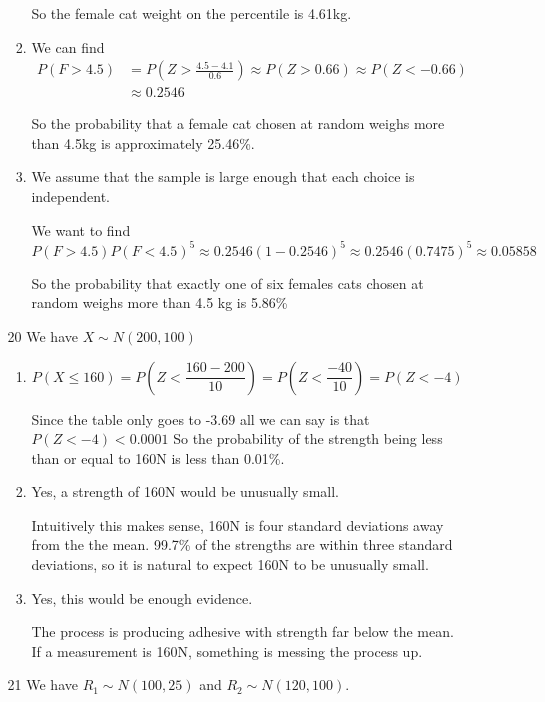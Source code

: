 \documentclass[12pt,letterpaper]{article}
\begin{document}
\begin{enumerate}
\begin{enumerate}
\begin{enumerate}[label=(\arabic*)]
              So the female cat weight on the  percentile is 4.61kg.
            \item
              We can find
              \begin{align*}
                P(F > 4.5) &= P\left(Z > \frac{4.5 - 4.1}{0.6}\right) \approx P(Z > 0.66) \approx P(Z < -0.66) \\
                &\approx 0.2546
              \end{align*}

              So the probability that a female cat chosen at random weighs more than 4.5kg is approximately 25.46\%.
            \item
              We assume that the sample is large enough that each choice is independent.

              We want to find
              \[
                P(F > 4.5) P(F < 4.5)^5 \approx 0.2546 (1 - 0.2546)^5 \approx 0.2546 (0.7475)^5 \approx 0.05858
              \]

              So the probability that exactly one of six females cats chosen at random weighs more than 4.5 kg is 5.86\%
          \end{enumerate}
        \item [20]
          We have $X \sim N(200, 100)$
          \begin{enumerate}[label=(\arabic*)]
            \item
              \[
                P(X \le 160) = P\left(Z < \frac{160 - 200}{10}\right) = P\left(Z < \frac{-40}{10}\right) = P(Z < -4)
              \]

              Since the table only goes to -3.69 all we can say is that $P(Z < -4) < 0.0001$
              So the probability of the strength being less than or equal to 160N is less than 0.01\%.
            \item
              Yes, a strength of 160N would be unusually small.

              Intuitively this makes sense, 160N is four standard deviations away from the the mean.
              99.7\% of the strengths are within three standard deviations,
              so it is natural to expect 160N to be unusually small.
            \item
              Yes, this would be enough evidence.

              The process is producing adhesive with strength far below the mean.
              If a measurement is 160N, something is messing the process up.
          \end{enumerate}
        \item [21]
          We have $R_1 \sim N(100, 25)$ and $R_2 \sim N(120, 100)$.


\end{enumerate}
\end{enumerate}
\end{document}
